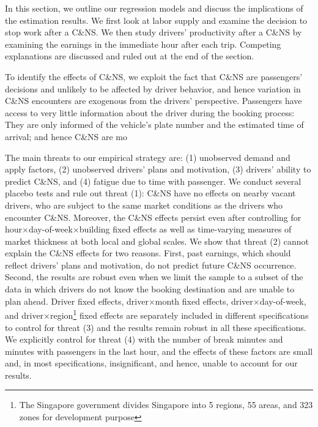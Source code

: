 \documentclass[reviewmode,AEJ]{AEA}
\begin{document}
In this section, we outline our regression models and discuss the implications of the estimation results.
We first look at labor supply and examine the decision to stop work after a C\&NS.
We then study drivers' productivity after a C\&NS by examining the earnings in the immediate hour after each trip. 
Competing explanations are discussed and ruled out at the end of the section.


To identify the effects of C\&NS, we exploit the fact that C\&NS are passengers' decisions and unlikely to be
affected by driver behavior, and hence variation in C\&NS encounters are exogenous from the drivers' perspective.
Passengers have access to very little information about the driver during the booking process: They are only informed of the vehicle's plate number and the estimated time of arrival; and hence C\&NS are mo

The main threats to our empirical strategy are: (1) unobserved demand and apply factors, (2) unobserved drivers' plans and motivation, (3) drivers' ability to predict C\&NS, and (4) fatigue due to time with passenger. We conduct several placebo tests and rule out threat (1): C\&NS have no effects on nearby vacant drivers, who are subject to the same market conditions as the drivers who encounter C\&NS. Moreover, the C\&NS effects persist even after controlling for hour\(\times\)day-of-week\(\times\)building fixed effects as well as time-varying measures of market thickness at both local and global scales. We show that threat (2) cannot explain the C\&NS effects for two reasons. First, past earnings, which should reflect drivers' plans and motivation, do not predict future C\&NS occurrence. Second, the results are robust even when we limit the sample to a subset of the data in which drivers do not know the booking destination and are unable to plan ahead. Driver fixed effects, driver\(\times\)month fixed effects, driver\(\times\)day-of-week, and driver\(\times\)region\footnote {The Singapore government divides Singapore into 5 regions, 55 areas, and 323 zones for development purpose} fixed effects are separately included in different specifications to control for threat (3) and the results remain robust in all these specifications. We explicitly control for threat (4) with the number of break minutes and minutes with passengers in the last hour, and the effects of these factors are small and, in most specifications, insignificant, and hence, unable to account for our results.
\end{document}
